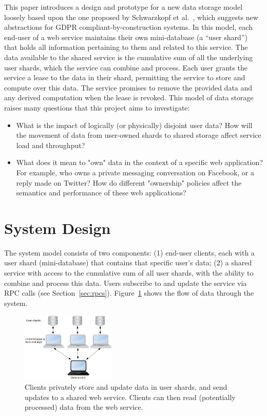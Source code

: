 \documentclass[letterpaper,twocolumn,10pt]{article}
\begin{document}
This paper introduces a design and prototype for a new data storage model loosely based upon the one proposed by Schwarzkopf et al.~\cite{positiongdpr}, 
which suggests new abstractions for GDPR compliant-by-construction systems. 
In this model, each end-user of a web service maintains their own mini-database (a ``user shard'') 
that holds all information pertaining to them and related to this service. 
The data available to the shared service is the cumulative sum of all the underlying user shards, which the service can combine and process. 
Each user grants the service a lease to the data in their shard, permitting the service to store and compute over this data. 
The service promises to remove the provided data and any derived computation when the lease is revoked.
This model of data storage raises many questions that this project aims to investigate:
\begin{itemize}
    \item What is the impact of logically (or physically) disjoint user data? How will the movement of data from user-owned shards to shared storage affect service load and throughput?
    \item What does it mean to "own" data in the context of a specific web application? For example, who owns a private messaging conversation on Facebook, or a reply made on Twitter?
        How do different "ownership" policies affect the semantics and performance of these web applications?
\end{itemize}

\section{System Design}
The system model consists of two components: 
(1) end-user clients, each with a user shard (mini-database) that contains that specific user's data; 
(2) a shared service with access to the cumulative sum of all user shards, with the ability to combine and process this data.
Users subscribe to and update the service via RPC calls (see Section~\ref{sec:rpcs}).
Figure~\ref{fig:design} shows the flow of data through the system.

\begin{figure}
    \centering
    \includegraphics[width=0.4\textwidth]{usershards}
    \caption{Clients privately store and update data in user shards, and send updates to a shared web service. Clients can then read (potentially processed) data from the web service.}
    \label{fig:design}
\end{figure}
\end{document}
